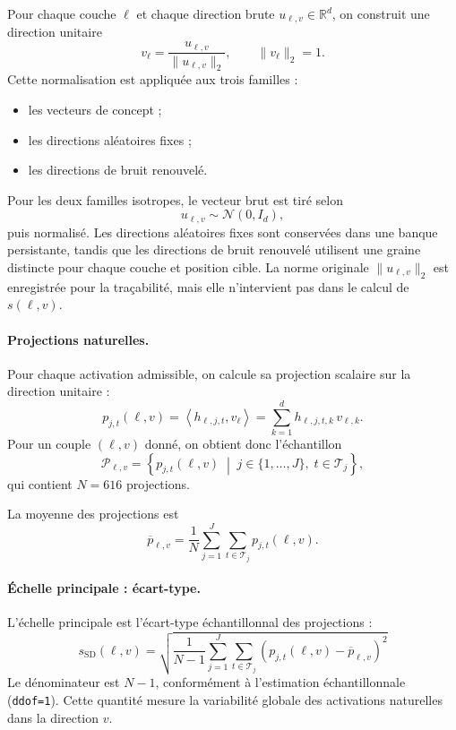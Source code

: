 \documentclass[a4paper,10pt]{article}
\begin{document}
Pour chaque couche $\ell$ et chaque direction brute
$u_{\ell,v}\in\mathbb{R}^{d}$, on construit une direction unitaire
\[
v_{\ell}
=
\frac{u_{\ell,v}}
     {\lVert u_{\ell,v}\rVert_2},
\qquad
\lVert v_{\ell}\rVert_2=1.
\]
Cette normalisation est appliquée aux trois familles :

\begin{itemize}
  \item les vecteurs de concept ;
  \item les directions aléatoires fixes ;
  \item les directions de bruit renouvelé.
\end{itemize}

Pour les deux familles isotropes, le vecteur brut est tiré selon
\[
u_{\ell,v}\sim\mathcal{N}(0,I_d),
\]
puis normalisé. Les directions aléatoires fixes sont conservées dans une banque
persistante, tandis que les directions de bruit renouvelé utilisent une graine
distincte pour chaque couche et position cible. La norme originale
$\lVert u_{\ell,v}\rVert_2$ est enregistrée pour la traçabilité, mais elle
n'intervient pas dans le calcul de $s(\ell,v)$.

\paragraph{Projections naturelles.}

Pour chaque activation admissible, on calcule sa projection scalaire sur la
direction unitaire :
\[
p_{j,t}(\ell,v)
=
\left\langle h_{\ell,j,t},v_{\ell}\right\rangle
=
\sum_{k=1}^{d}h_{\ell,j,t,k}\,v_{\ell,k}.
\]
Pour un couple $(\ell,v)$ donné, on obtient donc l'échantillon
\[
\mathcal{P}_{\ell,v}
=
\left\{
p_{j,t}(\ell,v)
\;\middle|\;
j\in\{1,\ldots,J\},\;
t\in\mathcal{T}_j
\right\},
\]
qui contient $N=616$ projections.

La moyenne des projections est
\[
\overline{p}_{\ell,v}
=
\frac{1}{N}
\sum_{j=1}^{J}
\sum_{t\in\mathcal{T}_j}
p_{j,t}(\ell,v).
\]

\paragraph{Échelle principale : écart-type.}

L'échelle principale est l'écart-type échantillonnal des projections :
\[
\boxed{
s_{\mathrm{SD}}(\ell,v)
=
\sqrt{
\frac{1}{N-1}
\sum_{j=1}^{J}
\sum_{t\in\mathcal{T}_j}
\left(
p_{j,t}(\ell,v)-\overline{p}_{\ell,v}
\right)^2
}
}
\]
Le dénominateur est $N-1$, conformément à l'estimation échantillonnale
(\texttt{ddof=1}). Cette quantité mesure la variabilité globale des activations
naturelles dans la direction $v$.
\end{document}

